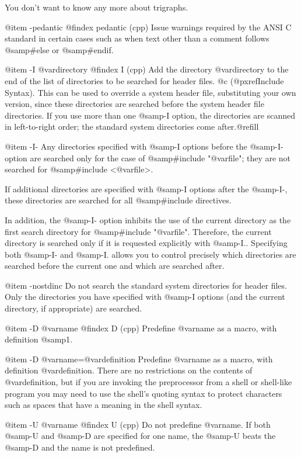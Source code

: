 {{{You don't want to know any more about trigraphs.

@item -pedantic
@findex pedantic (cpp)
Issue warnings required by the ANSI C standard in certain cases such
as when text other than a comment follows @samp{#else} or @samp{#endif}.


@item -I @var{directory}
@findex I (cpp)
Add the directory @var{directory} to the end of the list of
directories to be searched for header files.
@c (@pxref{Include Syntax}).
This can be used to override a system header file, substituting your
own version, since these directories are searched before the system
header file directories.  If you use more than one @samp{-I} option,
the directories are scanned in left-to-right order; the standard
system directories come after.@refill

@item -I-
Any directories specified with @samp{-I} options before the @samp{-I-}
option are searched only for the case of @samp{#include "@var{file}"};
they are not searched for @samp{#include <@var{file}>}.

If additional directories are specified with @samp{-I} options after
the @samp{-I-}, these directories are searched for all @samp{#include}
directives.

In addition, the @samp{-I-} option inhibits the use of the current
directory as the first search directory for @samp{#include "@var{file}"}.
Therefore, the current directory is searched only if it is requested
explicitly with @samp{-I.}.  Specifying both @samp{-I-} and @samp{-I.}
allows you to control precisely which directories are searched before
the current one and which are searched after.

@item -nostdinc
Do not search the standard system directories for header files.
Only the directories you have specified with @samp{-I} options
(and the current directory, if appropriate) are searched.

@item -D @var{name}
@findex D (cpp)
Predefine @var{name} as a macro, with definition @samp{1}.

@item -D @var{name}=@var{definition}
Predefine @var{name} as a macro, with definition @var{definition}.
There are no restrictions on the contents of @var{definition}, but if
you are invoking the preprocessor from a shell or shell-like program
you may need to use the shell's quoting syntax to protect characters
such as spaces that have a meaning in the shell syntax.

@item -U @var{name}
@findex U (cpp)
Do not predefine @var{name}. If both @samp{-U} and @samp{-D} are
specified for one name, the @samp{-U} beats the @samp{-D} and the name
is not predefined.

}}}
